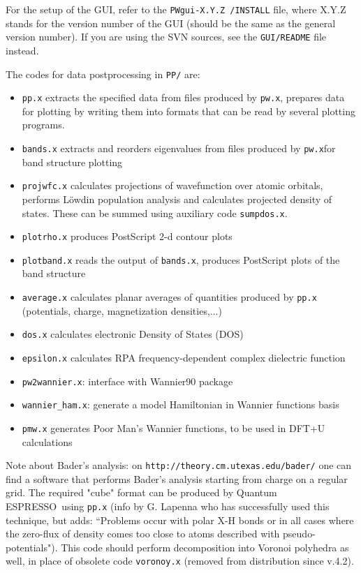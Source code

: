 \documentclass[12pt,a4paper]{article}
\def\qe{{\sc Quantum ESPRESSO}}
\def\pwx{\texttt{pw.x}}
\begin{document}
For the setup of the GUI, refer to the \texttt{PWgui-X.Y.Z /INSTALL} file, where
X.Y.Z stands for the version number of the GUI (should be the same as the
general version number). If you are using the SVN sources, see
the \texttt{GUI/README} file instead.
   
The codes for data postprocessing in \texttt{PP/} are:
\begin{itemize}
\item  \texttt{pp.x} extracts the specified data from files produced by \pwx,
  prepares data for plotting by writing them into formats that can be
  read by several plotting programs. 
\item  \texttt{bands.x} extracts and reorders eigenvalues from files produced by
  \pwx for band structure plotting 
\item  \texttt{projwfc.x} calculates projections of wavefunction over atomic
  orbitals, performs L\"owdin population analysis and calculates
  projected density of states. These can be summed using auxiliary
  code  \texttt{sumpdos.x}. 
\item  \texttt{plotrho.x} produces PostScript 2-d contour plots
\item  \texttt{plotband.x} reads the output of  \texttt{bands.x}, produces 
  PostScript plots of the band structure
\item  \texttt{average.x} calculates planar averages of quantities produced by
   \texttt{pp.x} (potentials, charge, magnetization densities,...) 
\item  \texttt{dos.x} calculates electronic Density of States (DOS)
\item \texttt{epsilon.x} calculates RPA frequency-dependent complex dielectric function
\item  \texttt{pw2wannier.x}: interface with Wannier90 package
\item  \texttt{wannier\_ham.x}: generate a model Hamiltonian 
in Wannier functions basis
\item  \texttt{pmw.x} generates Poor Man's Wannier functions, to be used in
  DFT+U calculations 
\end{itemize}
Note about Bader's analysis: on
\texttt{http://theory.cm.utexas.edu/bader/} one can find a software that performs
Bader's analysis starting from charge on a regular grid. The required 
"cube" format can be produced by \qe\ using  \texttt{pp.x} (info by G. Lapenna
who has successfully used this technique, but adds: ``Problems occur with polar 
X-H bonds or in all cases where the zero-flux of density comes too close to 
atoms described with pseudo-potentials"). This code should perform 
decomposition into Voronoi polyhedra as well, in place of obsolete
code  \texttt{voronoy.x} (removed from distribution since v.4.2).
\end{document}
